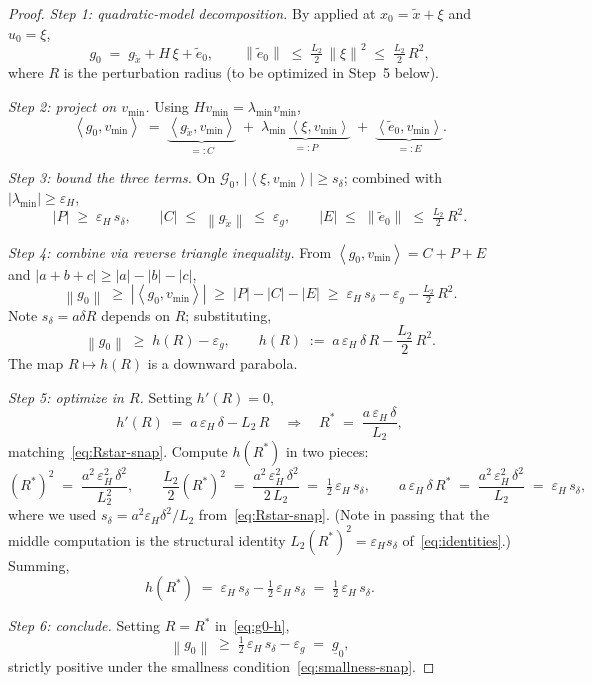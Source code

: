 \documentclass[11pt,a4paper]{article}
\theoremstyle{plain}
\theoremstyle{definition}
\newcommand{\norm}[1]{\left\|#1\right\|}
\newcommand{\inner}[2]{\left\langle #1,#2 \right\rangle}
\newcommand{\eps}{\varepsilon}
\newcommand{\epsg}{\eps_{g}}
\newcommand{\epsH}{\eps_{H}}
\newcommand{\Ltwo}{L_{2}}
\newcommand{\snap}{\tilde{x}}
\newcommand{\vmin}{v_{\min}}
\newcommand{\lmin}{\lambda_{\min}}
\newcommand{\sdel}{s_{\delta}}
\newcommand{\glow}{\underline{g}}
\newcommand{\Rstar}{R^{*}}
\begin{document}
\begin{proof}
\emph{Step 1: quadratic-model decomposition.}
By  applied at $x_{0}=\snap+\xi$ and $u_{0}=\xi$,
\[
g_{0} \;=\; g_{\snap} + H\,\xi + \tilde e_{0},
\qquad
\norm{\tilde e_{0}} \;\le\; \tfrac{\Ltwo}{2}\,\norm{\xi}^{2}
\;\le\; \tfrac{\Ltwo}{2}\,R^{2},
\]
where $R$ is the perturbation radius (to be optimized in Step~5 below).

\emph{Step 2: project on $\vmin$.}
Using $H\vmin=\lmin\vmin$,
\begin{equation}\label{eq:g0proj}
\inner{g_{0}}{\vmin}
\;=\; \underbrace{\inner{g_{\snap}}{\vmin}}_{=:C}
\;+\; \underbrace{\lmin\,\inner{\xi}{\vmin}}_{=:P}
\;+\; \underbrace{\inner{\tilde e_{0}}{\vmin}}_{=:E}.
\end{equation}

\emph{Step 3: bound the three terms.}
On $\mathcal{G}_{0}$, $|\inner{\xi}{\vmin}|\ge\sdel$; combined with
$|\lmin|\ge\epsH$,
\[
|P| \;\ge\; \epsH\,\sdel,
\qquad
|C| \;\le\; \norm{g_{\snap}} \;\le\; \epsg,
\qquad
|E| \;\le\; \norm{\tilde e_{0}} \;\le\; \tfrac{\Ltwo}{2}\,R^{2}.
\]

\emph{Step 4: combine via reverse triangle inequality.}
From $\inner{g_{0}}{\vmin}=C+P+E$ and $|a+b+c|\ge|a|-|b|-|c|$,
\begin{equation}\label{eq:g0-raw}
\norm{g_{0}}
\;\ge\; |\inner{g_{0}}{\vmin}|
\;\ge\; |P|-|C|-|E|
\;\ge\; \epsH\,\sdel - \epsg - \tfrac{\Ltwo}{2}\,R^{2}.
\end{equation}
Note $\sdel=a\delta R$ depends on $R$; substituting,
\begin{equation}\label{eq:g0-h}
\norm{g_{0}} \;\ge\; h(R)-\epsg,
\qquad
h(R) \;:=\; a\,\epsH\,\delta\,R - \frac{\Ltwo}{2}\,R^{2}.
\end{equation}
The map $R\mapsto h(R)$ is a downward parabola.

\emph{Step 5: optimize in $R$.}
Setting $h'(R)=0$,
\[
h'(R) \;=\; a\,\epsH\,\delta - \Ltwo\,R
\quad\Longrightarrow\quad
\Rstar \;=\; \frac{a\,\epsH\,\delta}{\Ltwo},
\]
matching~\eqref{eq:Rstar-snap}. Compute $h(\Rstar)$ in two pieces:
\[
(\Rstar)^{2}
\;=\; \frac{a^{2}\,\epsH^{2}\,\delta^{2}}{\Ltwo^{2}},
\qquad
\frac{\Ltwo}{2}(\Rstar)^{2}
\;=\; \frac{a^{2}\,\epsH^{2}\,\delta^{2}}{2\,\Ltwo}
\;=\;\tfrac12\,\epsH\,\sdel,
\qquad
a\,\epsH\,\delta\,\Rstar
\;=\; \frac{a^{2}\,\epsH^{2}\,\delta^{2}}{\Ltwo}
\;=\;\epsH\,\sdel,
\]
where we used $\sdel = a^{2}\epsH\delta^{2}/\Ltwo$
from~\eqref{eq:Rstar-snap}. (Note in passing that the middle computation is the
structural identity $\Ltwo(\Rstar)^{2}=\epsH\sdel$
of~\eqref{eq:identities}.) Summing,
\[
h(\Rstar)
\;=\; \epsH\,\sdel-\tfrac12\,\epsH\,\sdel
\;=\; \tfrac{1}{2}\,\epsH\,\sdel .
\]

\emph{Step 6: conclude.}
Setting $R=\Rstar$ in~\eqref{eq:g0-h},
\[
\norm{g_{0}} \;\ge\; \tfrac{1}{2}\,\epsH\,\sdel - \epsg \;=\; \glow_{0},
\]
strictly positive under the smallness condition~\eqref{eq:smallness-snap}.
\end{proof}
\end{document}
